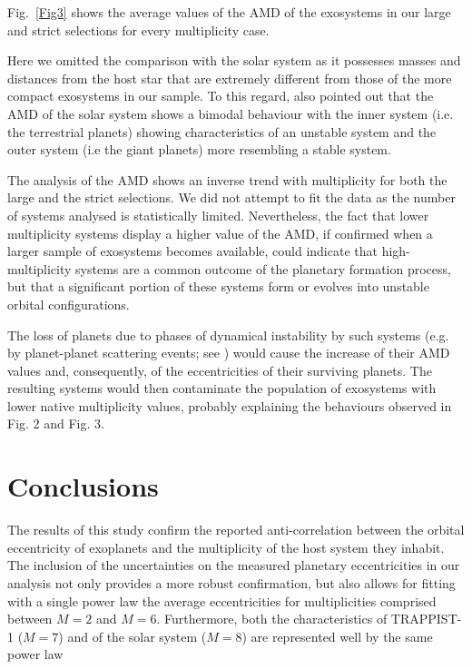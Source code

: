 \documentclass[letter]{aa} %
\begin{document}
        
        Fig.~\ref{Fig3} shows the average values of the AMD of the exosystems in our large and strict selections for every multiplicity case.

Here we omitted the comparison with the solar system as it possesses masses and distances from the host star that are extremely different from those of the more compact exosystems in our sample. To this regard, \cite{Laskar97} also pointed out that the AMD of the solar system shows a bimodal behaviour with the inner system (i.e. the terrestrial planets) showing characteristics of an unstable system and the outer system (i.e the giant planets) more resembling a stable system.

        The analysis of the AMD shows an inverse trend with multiplicity for both the large and the strict selections. We did not attempt to fit the data as the number of systems analysed is statistically limited. Nevertheless, the fact that lower multiplicity systems display a higher value of the AMD, if confirmed when a larger sample of exosystems becomes available, could indicate that high-multiplicity systems are a common outcome of the planetary formation process, but that a significant portion of these systems form or evolves into unstable orbital configurations. 
        
        The loss of planets due to phases of dynamical instability by such systems (e.g. by planet-planet scattering events; see \citealt{weidenschilling,rasio}) would cause the increase of their AMD values and, consequently, of the eccentricities of their surviving planets. The resulting systems would then contaminate the population of exosystems with lower native multiplicity values, probably explaining the behaviours  observed in Fig. 2 and Fig. 3.
               
        \section{Conclusions} 
        
The results of this study confirm the reported anti-correlation between  the orbital eccentricity of exoplanets and the multiplicity of the host system they inhabit. The inclusion of the uncertainties on the measured planetary eccentricities in our analysis not only provides a more robust confirmation, but also allows for fitting with a single power law the average eccentricities for multiplicities comprised between $M=2$ and $M=6$. Furthermore, both the characteristics of TRAPPIST-1 ($M=7$) and of the solar system ($M=8$) are represented well by the same power law
\end{document}

